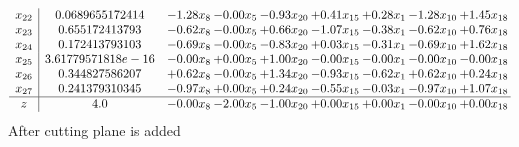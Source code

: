 \documentclass[8pt]{article}
\begin{document}
\[\begin{array}{c| c c@{\hskip 2pt} c@{\hskip 2pt} c@{\hskip 2pt} c@{\hskip 2pt} c@{\hskip 2pt} c@{\hskip 2pt} c@{\hskip 2pt} }
 x_{22}   &  0.0689655172414 & -1.28 x_{8} & -0.00 x_{5} & -0.93 x_{20} & +  0.41 x_{15} & +  0.28 x_{1} & -1.28 x_{10} & +  1.45 x_{18}\\
 x_{23}   &  0.655172413793 & -0.62 x_{8} & -0.00 x_{5} & +  0.66 x_{20} & -1.07 x_{15} & -0.38 x_{1} & -0.62 x_{10} & +  0.76 x_{18}\\
 x_{24}   &  0.172413793103 & -0.69 x_{8} & -0.00 x_{5} & -0.83 x_{20} & +  0.03 x_{15} & -0.31 x_{1} & -0.69 x_{10} & +  1.62 x_{18}\\
 x_{25}   &  3.61779571818e-16 & -0.00 x_{8} & +  0.00 x_{5} & +  1.00 x_{20} & -0.00 x_{15} & -0.00 x_{1} & -0.00 x_{10} & -0.00 x_{18}\\
 x_{26}   &  0.344827586207 & +  0.62 x_{8} & -0.00 x_{5} & +  1.34 x_{20} & -0.93 x_{15} & -0.62 x_{1} & +  0.62 x_{10} & +  0.24 x_{18}\\
 x_{27}   &  0.241379310345 & -0.97 x_{8} & +  0.00 x_{5} & +  0.24 x_{20} & -0.55 x_{15} & -0.03 x_{1} & -0.97 x_{10} & +  1.07 x_{18}\\
\hline
z    &  4.0 & -0.00 x_{8} & -2.00 x_{5} & -1.00 x_{20} & +  0.00 x_{15} & +  0.00 x_{1} & -0.00 x_{10} & +  0.00 x_{18}\\
\end{array}\]
 After cutting plane is added 
\end{document}
